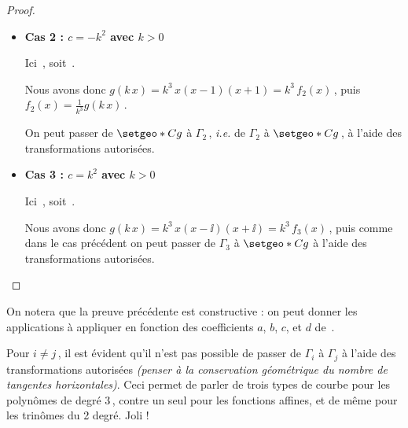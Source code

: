 \begin{proof}
\begin{enumerate}
\begin{itemize}
			\item \textbf{Cas 2 : $c = - k^2$ avec $k > 0$}
		
			\smallskip
			\noindent
			Ici
			\,,
			soit
			\,.
		
			\smallskip
			\noindent
			Nous avons donc $g(k \, x) = k^3 \, x(x - 1)(x + 1) = k^3 \, f_2(x)$\,,
			puis
			$f_2(x) = \frac{1}{k^3} g(k \, x)$\,.
		
			\smallskip
			\noindent
			On peut passer de $\setgeo*{C}{g}$ à $\Gamma_2$\,, \emph{i.e.} de $\Gamma_2$ à $\setgeo*{C}{g}$\,, à l'aide des transformations autorisées.


			\item \textbf{Cas 3 : $c = k^2$ avec $k > 0$}
		
			\smallskip
			\noindent
			Ici
			\,,
			soit
			\,.
		
			\smallskip
			\noindent
			Nous avons donc $g(k \, x) = k^3 \, x(x - \ii)(x + \ii) = k^3 \, f_3(x)$\,,
			puis comme dans le cas précédent on peut passer de $\Gamma_3$ à $\setgeo*{C}{g}$ à l'aide des transformations autorisées.
		\end{itemize}
	\end{enumerate}
\end{proof}




\begin{remark}
	On notera que la preuve précédente est constructive : on peut donner les applications à appliquer en fonction des coefficients $a$, $b$, $c$, et $d$ de \,.
\end{remark}




\medskip

Pour $i \neq j$\,, il est évident qu'il n'est pas possible de passer de $\Gamma_i$  à $\Gamma_j$ à l'aide des transformations autorisées \emph{(penser à la conservation géométrique du nombre de tangentes horizontales)}.
Ceci permet de parler de trois types de courbe pour les polynômes de degré $3$\,, contre un seul pour les fonctions affines, et de même pour les trinômes du 2\ieme{} degré. Joli !
